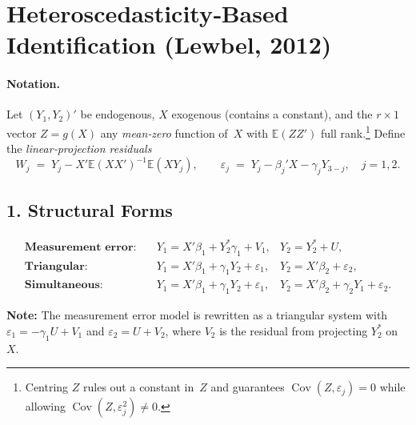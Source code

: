 \documentclass{article}
\newcommand{\E}{\mathbb{E}}
\newcommand{\cov}{\operatorname{Cov}}
\theoremstyle{plain}
\begin{document}
\section*{Heteroscedasticity‐Based Identification (Lewbel, 2012)}

\vspace{-0.8em}
\paragraph{Notation.}
Let $(Y_1,Y_2)'$ be endogenous, $X$ exogenous (contains a constant), and the $r\times 1$
vector $Z=g(X)$ any \emph{mean‑zero} function of~$X$ with $\E(ZZ')$ full rank.\footnote{%
Centring $Z$ rules out a constant in~$Z$ and guarantees
$\cov(Z,\varepsilon_j)=0$ while allowing $\cov(Z,\varepsilon_j^{2})\neq0$.
}
Define the \emph{linear‑projection residuals}
\[
W_j \;=\; Y_j-X'\E(XX')^{-1}\E(XY_j), \qquad
\varepsilon_j \;=\; Y_j-\beta_j'X-\gamma_jY_{3-j}, \quad j=1,2.
\]

\subsection*{1. Structural Forms}
\begin{align*}
\textbf{Measurement error:}\quad 
&Y_1 = X'\beta_1 + Y_2^*\gamma_1 + V_1, & Y_2 = Y_2^* + U,\\[2pt]
\textbf{Triangular:}\quad
&Y_1 = X'\beta_1+\gamma_1Y_2+\varepsilon_1, &
Y_2 = X'\beta_2+\varepsilon_2,\\[2pt]
\textbf{Simultaneous:}\quad
&Y_1 = X'\beta_1+\gamma_1Y_2+\varepsilon_1, &
Y_2 = X'\beta_2+\gamma_2Y_1+\varepsilon_2.
\end{align*}

\textbf{Note:} The measurement error model is rewritten as a triangular system with
$\varepsilon_1 = -\gamma_1 U + V_1$ and $\varepsilon_2 = U + V_2$, where $V_2$ is the 
residual from projecting $Y_2^*$ on $X$.

\end{document}
